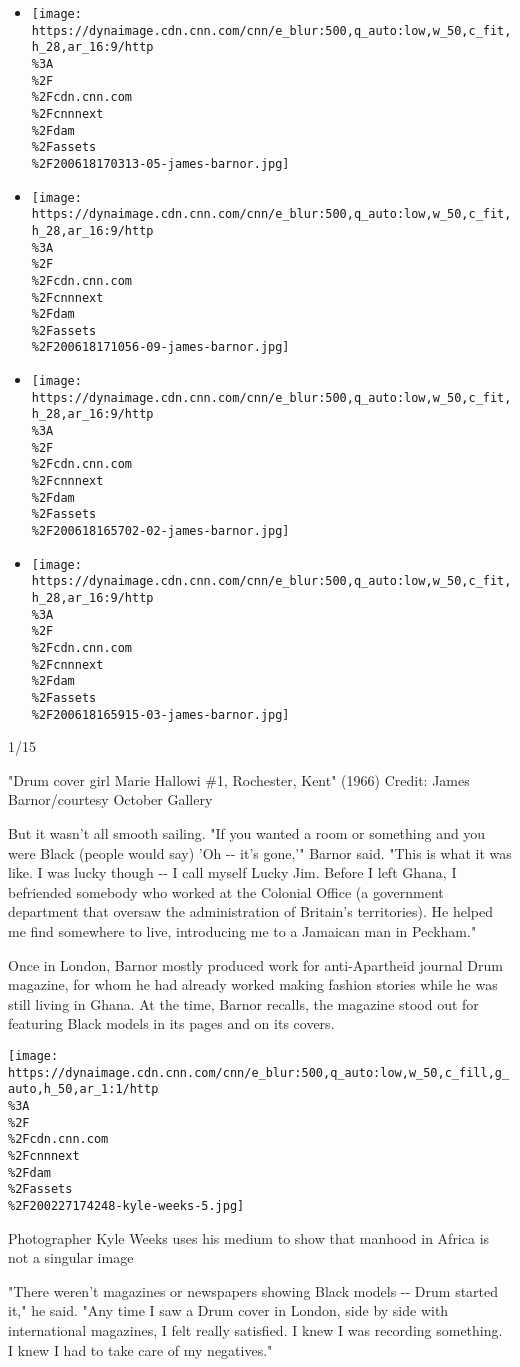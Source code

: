 \begin{itemize}
\item
  \texttt{[image: https://dynaimage.cdn.cnn.com/cnn/e\_blur:500,q\_auto:low,w\_50,c\_fit,h\_28,ar\_16:9/http\\\%3A\\\%2F\\\%2Fcdn.cnn.com\\\%2Fcnnnext\\\%2Fdam\\\%2Fassets\\\%2F200618170313-05-james-barnor.jpg]}
\item
  \texttt{[image: https://dynaimage.cdn.cnn.com/cnn/e\_blur:500,q\_auto:low,w\_50,c\_fit,h\_28,ar\_16:9/http\\\%3A\\\%2F\\\%2Fcdn.cnn.com\\\%2Fcnnnext\\\%2Fdam\\\%2Fassets\\\%2F200618171056-09-james-barnor.jpg]}
\item
  \texttt{[image: https://dynaimage.cdn.cnn.com/cnn/e\_blur:500,q\_auto:low,w\_50,c\_fit,h\_28,ar\_16:9/http\\\%3A\\\%2F\\\%2Fcdn.cnn.com\\\%2Fcnnnext\\\%2Fdam\\\%2Fassets\\\%2F200618165702-02-james-barnor.jpg]}
\item
  \texttt{[image: https://dynaimage.cdn.cnn.com/cnn/e\_blur:500,q\_auto:low,w\_50,c\_fit,h\_28,ar\_16:9/http\\\%3A\\\%2F\\\%2Fcdn.cnn.com\\\%2Fcnnnext\\\%2Fdam\\\%2Fassets\\\%2F200618165915-03-james-barnor.jpg]}
\end{itemize}

1/15

"Drum cover girl Marie Hallowi \#1, Rochester, Kent" (1966) Credit:
James Barnor/courtesy October Gallery

But it wasn't all smooth sailing. "If you wanted a room or something and
you were Black (people would say) 'Oh -\/- it's gone,'" Barnor said.
"This is what it was like. I was lucky though -\/- I call myself Lucky
Jim. Before I left Ghana, I befriended somebody who worked at the
Colonial Office (a government department that oversaw the administration
of Britain's territories). He helped me find somewhere to live,
introducing me to a Jamaican man in Peckham."

Once in London, Barnor mostly produced work for anti-Apartheid journal
Drum magazine, for whom he had already worked making fashion stories
while he was still living in Ghana. At the time, Barnor recalls, the
magazine stood out for featuring Black models in its pages and on its
covers.

\href{/style/article/kyle-weeks-photography-africa/index.html}{}

\texttt{[image: https://dynaimage.cdn.cnn.com/cnn/e\_blur:500,q\_auto:low,w\_50,c\_fill,g\_auto,h\_50,ar\_1:1/http\\\%3A\\\%2F\\\%2Fcdn.cnn.com\\\%2Fcnnnext\\\%2Fdam\\\%2Fassets\\\%2F200227174248-kyle-weeks-5.jpg]}

Photographer Kyle Weeks uses his medium to show that manhood in Africa
is not a singular image

"There weren't magazines or newspapers showing Black models -\/- Drum
started it," he said. "Any time I saw a Drum cover in London, side by
side with international magazines, I felt really satisfied. I knew I was
recording something. I knew I had to take care of my negatives."

